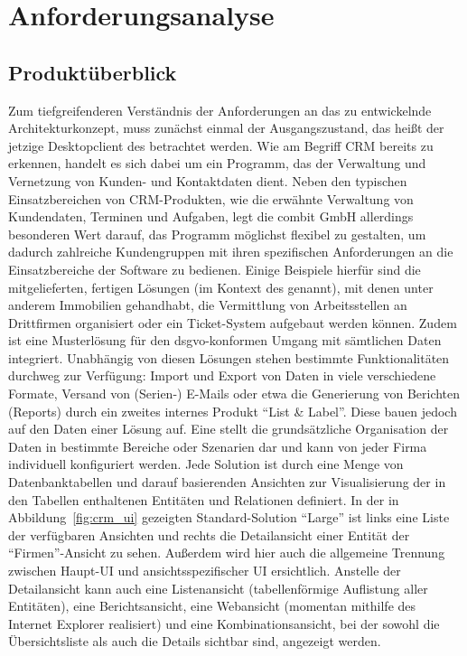 \chapter{Anforderungsanalyse}\label{chap:requirements}

\section{Produktüberblick}\label{sec:product_overview}
Zum tiefgreifenderen Verständnis der Anforderungen an das zu entwickelnde Architekturkonzept, muss zunächst einmal der Ausgangszustand, das heißt der jetzige Desktopclient des  betrachtet werden. Wie am Begriff \gls{CRM} bereits zu erkennen, handelt es sich dabei um ein Programm, das der Verwaltung und Vernetzung von Kunden- und Kontaktdaten dient. Neben den typischen Einsatzbereichen von \gls{CRM}-Produkten, wie die erwähnte Verwaltung von Kundendaten, Terminen und Aufgaben, legt die combit GmbH allerdings besonderen Wert darauf, das Programm möglichst flexibel zu gestalten, um dadurch zahlreiche Kundengruppen mit ihren spezifischen Anforderungen an die Einsatzbereiche der Software zu bedienen. Einige Beispiele hierfür sind die mitgelieferten, fertigen Lösungen (im Kontext des   genannt), mit denen unter anderem Immobilien gehandhabt, die Vermittlung von Arbeitsstellen an Drittfirmen organisiert oder ein Ticket-System aufgebaut werden können. Zudem ist eine Musterlösung für den \gls{dsgvo}-konformen Umgang mit sämtlichen Daten integriert. Unabhängig von diesen Lösungen stehen bestimmte Funktionalitäten durchweg zur Verfügung: Import und Export von Daten in viele verschiedene Formate, Versand von (Serien-) E-Mails oder etwa die Generierung von Berichten (Reports) durch ein zweites internes Produkt ``List \& Label''. Diese bauen jedoch auf den Daten einer Lösung auf.
Eine  stellt die grundsätzliche Organisation der Daten in bestimmte Bereiche oder Szenarien dar und kann von jeder Firma individuell konfiguriert werden. Jede Solution ist durch eine Menge von Datenbanktabellen und darauf basierenden Ansichten zur Visualisierung der in den Tabellen enthaltenen Entitäten und Relationen definiert. In der in Abbildung~\ref{fig:crm_ui} gezeigten Standard-Solution ``Large'' ist links eine Liste der verfügbaren Ansichten und rechts die Detailansicht einer Entität der ``Firmen''-Ansicht zu sehen. Außerdem wird hier auch die allgemeine Trennung zwischen Haupt-UI und ansichtsspezifischer UI ersichtlich. Anstelle der Detailansicht kann auch eine Listenansicht (tabellenförmige Auflistung aller Entitäten), eine Berichtsansicht, eine Webansicht (momentan mithilfe des Internet Explorer realisiert) und eine Kombinationsansicht, bei der sowohl die Übersichtsliste als auch die Details sichtbar sind, angezeigt werden.

